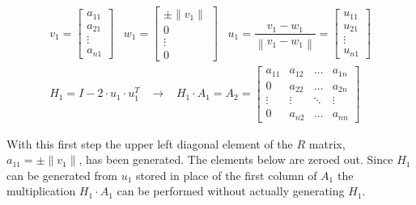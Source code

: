 \begin{equation}
\begin{split}
v_1 =
\begin{bmatrix}
a_{11}\\
a_{21}\\
\vdots\\
a_{n1}
\end{bmatrix}
\;\;\;
w_1 =
\begin{bmatrix}
\pm\lVert v_1 \rVert\\
0\\
\vdots\\
0
\end{bmatrix}
\;\;\;
u_1 = \dfrac{v_1 - w_1}{\left\lVert v_1 - w_1\right\rVert} =
\begin{bmatrix}
u_{11}\\
u_{21}\\
\vdots\\
u_{n1}
\end{bmatrix}
\\
H_1 = I - 2 \cdot u_1 \cdot u_1^T
\;\;\; \rightarrow \;\;\;
H_1 \cdot A_1 = A_2 =
\begin{bmatrix}
a_{11} & a_{12} & \ldots & a_{1n}\\
0 & a_{22} & \ldots & a_{2n}\\
\vdots & \vdots & \ddots & \vdots\\
0 & a_{n2} & \ldots & a_{nn}
\end{bmatrix}
\end{split}
\end{equation}

With this first step the upper left diagonal element of the $R$
matrix, $a_{11} = \pm\lVert v_1 \rVert$, has been generated.  The
elements below are zeroed out.  Since $H_1$ can be generated from
$u_1$ stored in place of the first column of $A_1$ the multiplication
$H_1 \cdot A_1$ can be performed without actually generating $H_1$.

